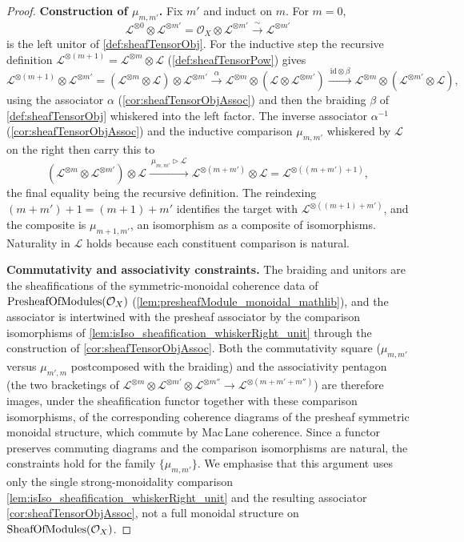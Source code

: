 \begin{proof}
  \textbf{Construction of \(\mu_{m,m'}\).} Fix \(m'\) and induct on \(m\). For
  \(m = 0\),
  \[
    \mathcal{L}^{\otimes 0} \otimes \mathcal{L}^{\otimes m'}
      = \mathcal{O}_X \otimes \mathcal{L}^{\otimes m'}
      \xrightarrow{\ \sim\ } \mathcal{L}^{\otimes m'}
  \]
  is the left unitor of \cref{def:sheafTensorObj}. For the inductive step the
  recursive definition
  \(\mathcal{L}^{\otimes (m+1)} = \mathcal{L}^{\otimes m} \otimes \mathcal{L}\)
  (\cref{def:sheafTensorPow}) gives
  \[
    \mathcal{L}^{\otimes (m+1)} \otimes \mathcal{L}^{\otimes m'}
    = (\mathcal{L}^{\otimes m} \otimes \mathcal{L}) \otimes
      \mathcal{L}^{\otimes m'}
    \xrightarrow{\ \alpha\ } \mathcal{L}^{\otimes m} \otimes
      (\mathcal{L} \otimes \mathcal{L}^{\otimes m'})
    \xrightarrow{\ \mathrm{id} \otimes \beta\ } \mathcal{L}^{\otimes m} \otimes
      (\mathcal{L}^{\otimes m'} \otimes \mathcal{L}),
  \]
  using the associator \(\alpha\) (\cref{cor:sheafTensorObjAssoc}) and then the
  braiding \(\beta\) of \cref{def:sheafTensorObj} whiskered into the left
  factor. The inverse associator \(\alpha^{-1}\)
  (\cref{cor:sheafTensorObjAssoc}) and the inductive comparison \(\mu_{m,m'}\)
  whiskered by \(\mathcal{L}\) on the right then carry this to
  \[
    (\mathcal{L}^{\otimes m} \otimes \mathcal{L}^{\otimes m'}) \otimes
      \mathcal{L}
    \xrightarrow{\ \mu_{m,m'} \rhd \mathcal{L}\ }
    \mathcal{L}^{\otimes (m + m')} \otimes \mathcal{L}
    = \mathcal{L}^{\otimes ((m + m') + 1)},
  \]
  the final equality being the recursive definition. The reindexing
  \((m + m') + 1 = (m + 1) + m'\) identifies the target with
  \(\mathcal{L}^{\otimes ((m+1) + m')}\), and the composite is
  \(\mu_{m+1,m'}\), an isomorphism as a composite of isomorphisms. Naturality in
  \(\mathcal{L}\) holds because each constituent comparison is natural.

  \textbf{Commutativity and associativity constraints.} The braiding and
  unitors are the sheafifications of the symmetric-monoidal coherence data of
  \(\mathrm{PresheafOfModules}(\mathcal{O}_X)\) (\cref{lem:presheafModule_monoidal_mathlib}), and
  the associator is intertwined with the presheaf associator by the comparison
  isomorphisms of \cref{lem:isIso_sheafification_whiskerRight_unit} through the
  construction of \cref{cor:sheafTensorObjAssoc}. Both the commutativity square
  (\(\mu_{m,m'}\) versus \(\mu_{m',m}\) postcomposed with the braiding) and the
  associativity pentagon (the two bracketings of
  \(\mathcal{L}^{\otimes m} \otimes \mathcal{L}^{\otimes m'} \otimes
  \mathcal{L}^{\otimes m''} \to \mathcal{L}^{\otimes (m+m'+m'')}\)) are therefore
  images, under the sheafification functor together with these comparison
  isomorphisms, of the corresponding coherence diagrams of the presheaf
  symmetric monoidal structure, which commute by Mac\,Lane coherence. Since a
  functor preserves commuting diagrams and the comparison isomorphisms are
  natural, the constraints hold for the family \(\{\mu_{m,m'}\}\). We emphasise
  that this argument uses only the single strong-monoidality comparison
  \cref{lem:isIso_sheafification_whiskerRight_unit} and the resulting associator
  \cref{cor:sheafTensorObjAssoc}, not a full monoidal structure on
  \(\mathrm{SheafOfModules}(\mathcal{O}_X)\).
\end{proof}

